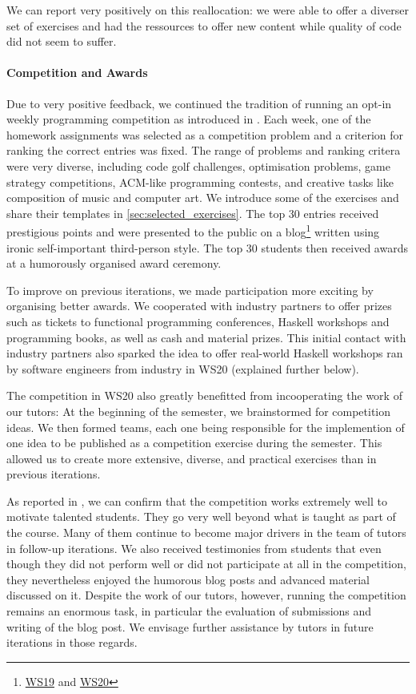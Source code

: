 We can report very positively on this reallocation:
we were able to offer a diverser set of exercises and
had the ressources to offer new content
while quality of code did not seem to suffer.

\paragraph{Competition and Awards}
Due to very positive feedback,
we continued the tradition of running an opt-in weekly
programming competition as introduced in \cite{next_1100}.
Each week, one of the homework assignments
was selected as a competition problem
and a criterion for ranking the correct entries was fixed.
The range of problems and ranking critera were very diverse,
including code golf challenges,
optimisation problems,
game strategy competitions,
ACM-like programming contests,
and creative tasks like composition of music
and computer art.
We introduce some of the exercises and share their templates in \cref{sec:selected_exercises}.
The top 30 entries received prestigious points
and were presented to the public on a blog\footnote{\href{https://www21.in.tum.de/teaching/fpv/WS19/wettbewerb.html}{WS19} and \href{https://www21.in.tum.de/teaching/fpv/WS20/wettbewerb.html}{WS20}}
written using ironic self-important third-person style.
The top 30 students then received awards at
a humorously organised award ceremony.

To improve on previous iterations,
we made participation more exciting by organising better awards.
We cooperated with industry partners
to offer prizes such as tickets to functional programming conferences,
Haskell workshops and programming books, as well as cash and material prizes.
This initial contact with industry partners
also sparked the idea to offer real-world Haskell workshops
ran by software engineers from industry in WS20 (explained further below).

The competition in WS20 also greatly benefitted from incooperating the work of our tutors:
At the beginning of the semester,
we brainstormed for competition ideas.
We then formed teams, each one being responsible for the
implemention of one idea to be published as a competition exercise during the semester.
This allowed us to create more extensive, diverse,
and practical exercises than in previous iterations.

As reported in \cite{next_1100},
we can confirm that the competition works extremely well to motivate talented students.
They go very well beyond what is taught as part of the course.
Many of them continue to become major drivers in
the team of tutors in follow-up iterations.
We also received testimonies from students that even though they did not perform well or did not participate at all in the competition,
they nevertheless enjoyed the humorous blog posts and advanced material discussed on it.
Despite the work of our tutors,
however,
running the competition remains an enormous task,
in particular the evaluation of submissions and
writing of the blog post.
We envisage further assistance by tutors in future iterations in those regards.


